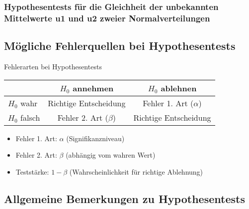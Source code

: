 \subsubsection{Hypothesentests für die Gleichheit der unbekannten Mittelwerte u1 und u2 zweier Normalverteilungen}

\subsection{Mögliche Fehlerquellen bei Hypothesentests}

\begin{concept}{Fehlerarten bei Hypothesentests}\\
\begin{center}
\begin{tabular}{|l|c|c|}
\hline
& $H_0$ annehmen & $H_0$ ablehnen \\
\hline
$H_0$ wahr & Richtige Entscheidung & Fehler 1. Art ($\alpha$) \\
\hline
$H_0$ falsch & Fehler 2. Art ($\beta$) & Richtige Entscheidung \\
\hline
\end{tabular}
\end{center}

\begin{itemize}
  \item Fehler 1. Art: $\alpha$ (Signifikanzniveau)
  \item Fehler 2. Art: $\beta$ (abhängig vom wahren Wert)
  \item Teststärke: $1-\beta$ (Wahrscheinlichkeit für richtige Ablehnung)
\end{itemize}
\end{concept}





\subsection{Allgemeine Bemerkungen zu Hypothesentests}


